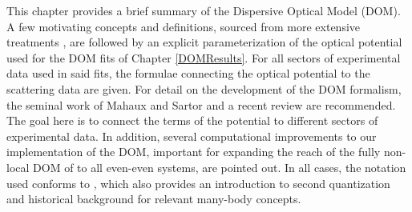 This chapter provides a brief summary of the Dispersive Optical Model (\gls{DOM}).
A few motivating concepts and definitions, sourced from more
extensive treatments \cite{MahzoonPhDThesis, MBTE},
are followed by an explicit parameterization of the \gls{optical potential} used for the DOM fits of Chapter \ref{DOMResults}.
For all sectors of experimental data used in said fits, the formulae connecting the optical potential
to the scattering data are given. For detail on the development of the DOM formalism, the seminal
work of Mahaux and Sartor \cite{Mahaux1991} and a recent review \cite{Dickhoff2018} are recommended.
The goal here is to connect the terms of the potential to different sectors of experimental data.
In addition, several computational improvements to our implementation of the DOM, important for
expanding the reach of the fully non-local DOM of \cite{MahzoonPhDThesis} to all even-even systems,
are pointed out. In all cases, the notation used conforms to \cite{MBTE}, which also provides an
introduction to second quantization and historical background for relevant many-body concepts.

